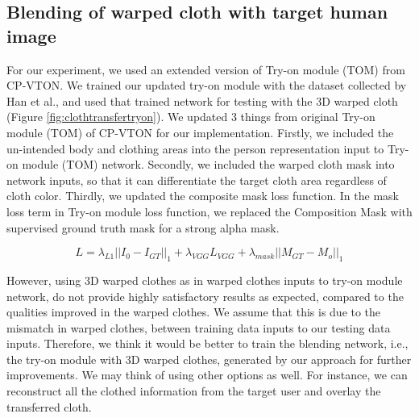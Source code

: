 \subsection{Blending of warped cloth with target human image}  \label{section:tryon}

For our experiment, we used an extended version of Try-on module (TOM) from CP-VTON\cite{Wang2018TowardCI}. We trained  our updated try-on module with the dataset collected by Han et al.\cite{Han2017VITONAI}, and used that trained network for testing with the 3D warped cloth (Figure \ref{fig:clothtransfertryon}). We updated 3 things from original Try-on module (TOM) of CP-VTON\cite{Wang2018TowardCI} for our implementation. Firstly, we included the un-intended body and clothing areas into the person representation input to Try-on module (TOM) network\cite{Wang2018TowardCI}. Secondly, we included the warped cloth mask into network inputs, so that it can differentiate the target cloth area regardless of cloth color. Thirdly, we updated the composite mask loss function\cite{Wang2018TowardCI}. In the mask loss term in Try-on module loss function\cite{Wang2018TowardCI}, we replaced the Composition Mask with supervised ground truth mask for a strong alpha mask.


\begin{equation}
L = \lambda_{L1} || I_0-I_{GT}||_1+  \lambda_{VGG} L_{VGG} + \lambda_{mask} ||M_{GT}-M_o||_1       
\end{equation}


However, using 3D warped clothes as in warped clothes inputs to try-on module network, do not provide highly satisfactory results as expected, compared to the qualities improved in the warped clothes. We assume that this is due to the mismatch in warped clothes, between training data inputs to our testing data inputs. Therefore, we think it would be better to train the blending network, i.e., the try-on module with 3D warped clothes, generated by our approach for further improvements. We may think of using other options as well. For instance, we can reconstruct all the clothed information from the target user and overlay the transferred cloth.






